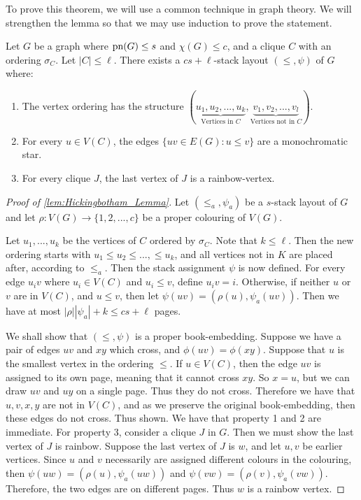 To prove this theorem, we will use a common technique in graph theory. We will strengthen the lemma so that we may use induction to prove the statement.
\begin{lemma}\label{lem:Hickingbotham_Lemma}
	Let \(G\) be a graph where \(\text{pn}(G) \leq s\) and \(\chi(G) \leq c\), and a clique \(C\) with an ordering \(\sigma_C\). Let \(|C| \leq \ell\). There exists a \(cs + \ell\)-stack layout \((\leq, \psi)\) of \(G\) where:
	\begin{enumerate}
		\item The vertex ordering has the structure \((\underbrace{u_1, u_2, ..., u_k}_{\text{Vertices in } C}, \underbrace{v_1, v_2, ..., v_l}_{\text{Vertices not in }C})\). 
		\item For every \(u \in V(C)\), the edges \(\lbrace uv \in E(G) : u \leq v \rbrace\) are a monochromatic star. 
		\item For every clique \(J\), the last vertex of \(J\) is a rainbow-vertex. 
	\end{enumerate}
\end{lemma}
\begin{proof}[Proof of \cref{lem:Hickingbotham_Lemma}]
	Let \((\leq_a, \psi_a)\) be a \(s\)-stack layout of \(G\) and let \(\rho: V(G) \rightarrow \lbrace 1, 2, ..., c\rbrace\) be a proper colouring of \(V(G)\).
	
	Let \(u_1, ..., u_k\) be the vertices of \(C\) ordered by \(\sigma_C\). Note that \(k \leq \ell\). Then the new ordering starts with \(u_1 \leq u_2 \leq ..., \leq u_k\), and all vertices not in \(K\) are placed after, according to \(\leq_a\).
	Then the stack assignment \(\psi\) is now defined. For every edge \(u_i v\) where \(u_i \in V(C)\) and \(u_i \leq v\), define \(u_i v = i\). Otherwise, if neither \(u\) or \(v\) are in \(V(C)\), and \(u \leq v\), then let \(\psi(uv) = (\rho(u), \psi_a(uv))\). Then we have at most \(|\rho| |\psi_a| + k \leq cs + \ell\) pages.
	
	We shall show that \((\leq, \psi)\) is a proper book-embedding. Suppose we have a pair of edges \(uv\) and \(xy\) which cross, and \(\phi(uv) = \phi(xy)\). Suppose that \(u\) is the smallest vertex in the ordering \(\leq\). If \(u \in V(C)\), then the edge \(uv\) is assigned to its own page, meaning that it cannot cross \(xy\). So \(x = u\), but we can draw \(uv\) and \(uy\) on a single page. Thus they do not cross. Therefore we have that \(u, v, x, y\) are not in \(V(C)\), and as we preserve the original book-embedding, then these edges do not cross. Thus shown.
	We have that property 1 and 2 are immediate. For property 3, consider a clique \(J\) in \(G\). Then we must show the last vertex of \(J\) is rainbow. Suppose the last vertex of \(J\) is \(w\), and let \(u, v\) be earlier vertices. Since \(u\) and \(v\) necessarily are assigned different colours in the colouring, then \(\psi(uw) = (\rho(u), \psi_a(uw))\) and \(\psi(vw) = (\rho(v), \psi_a(vw))\). Therefore, the two edges are on different pages. Thus \(w\) is a rainbow vertex. 
\end{proof}

